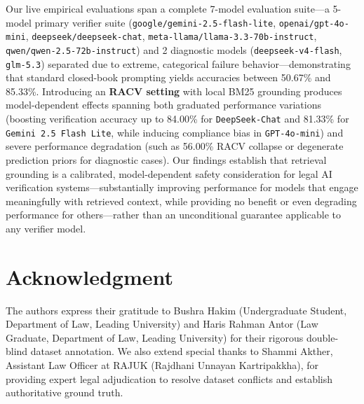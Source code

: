 \documentclass[conference]{IEEEtran}
\begin{document}
Our live empirical evaluations span a complete 7-model evaluation suite—a 5-model primary verifier suite (\texttt{google/gemini-2.5-flash-lite}, \texttt{openai/gpt-4o-mini}, \texttt{deepseek/deepseek-chat}, \texttt{meta-llama/llama-3.3-70b-instruct}, \texttt{qwen/qwen-2.5-72b-instruct}) and 2 diagnostic models (\texttt{deepseek-v4-flash}, \texttt{glm-5.3}) separated due to extreme, categorical failure behavior—demonstrating that standard closed-book prompting yields accuracies between 50.67\% and 85.33\%. Introducing an \textbf{RACV setting} with local BM25 grounding produces model-dependent effects spanning both graduated performance variations (boosting verification accuracy up to 84.00\% for \texttt{DeepSeek-Chat} and 81.33\% for \texttt{Gemini 2.5 Flash Lite}, while inducing compliance bias in \texttt{GPT-4o-mini}) and severe performance degradation (such as 56.00\% RACV collapse or degenerate prediction priors for diagnostic cases). Our findings establish that retrieval grounding is a calibrated, model-dependent safety consideration for legal AI verification systems—substantially improving performance for models that engage meaningfully with retrieved context, while providing no benefit or even degrading performance for others—rather than an unconditional guarantee applicable to any verifier model.

\section*{Acknowledgment}
The authors express their gratitude to Bushra Hakim (Undergraduate Student, Department of Law, Leading University) and Haris Rahman Antor (Law Graduate, Department of Law, Leading University) for their rigorous double-blind dataset annotation. We also extend special thanks to Shammi Akther, Assistant Law Officer at RAJUK (Rajdhani Unnayan Kartripakkha), for providing expert legal adjudication to resolve dataset conflicts and establish authoritative ground truth.
\end{document}
